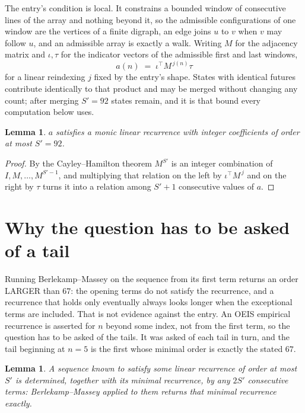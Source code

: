 \documentclass[11pt,a4paper]{article}
\theoremstyle{plain}
\newtheorem{lemma}[theorem]{Lemma}
\theoremstyle{definition}
\begin{document}
The entry's condition is local. It constrains a bounded window of consecutive lines of the
array and nothing beyond it, so the admissible configurations of one window are the vertices of
a finite digraph, an edge joins $u$ to $v$ when $v$ may follow $u$, and an admissible array is
exactly a walk. Writing $M$ for the adjacency matrix and $\iota,\tau$ for the indicator vectors
of the admissible first and last windows,
\[
a(n)\;=\;\iota^{\!\top}M^{\,j(n)}\tau
\]
for a linear reindexing $j$ fixed by the entry's shape. States with identical futures
contribute identically to that product and may be merged without changing any count; after
merging $S'=92$ states remain, and it is that bound every computation below uses.

\begin{lemma}\label{lem:cf}
$a$ satisfies a monic linear recurrence with integer coefficients of order at most $S'=92$.
\end{lemma}

\begin{proof}
By the Cayley--Hamilton theorem $M^{S'}$ is an integer combination of $I,M,\dots,M^{S'-1}$,
and multiplying that relation on the left by $\iota^{\!\top}M^{\,j}$ and on the right by
$\tau$ turns it into a relation among $S'+1$ consecutive values of $a$.
\end{proof}

\section{Why the question has to be asked of a tail}

Running Berlekamp--Massey on the sequence from its first term returns an order LARGER than $67$: the opening terms do not satisfy the recurrence, and a recurrence that holds only eventually always looks longer when the exceptional terms are included. That is not evidence against the entry. An OEIS empirical recurrence is asserted for $n$ beyond some index, not from the first term, so the question has to be asked of the tails. It was asked of each tail in turn, and the tail beginning at $n=5$ is the first whose minimal order is exactly the stated $67$.

\begin{lemma}\label{lem:bm}
A sequence known to satisfy some linear recurrence of order at most $S'$ is determined,
together with its minimal recurrence, by any $2S'$ consecutive terms: Berlekamp--Massey applied
to them returns that minimal recurrence exactly.
\end{lemma}
\end{document}
